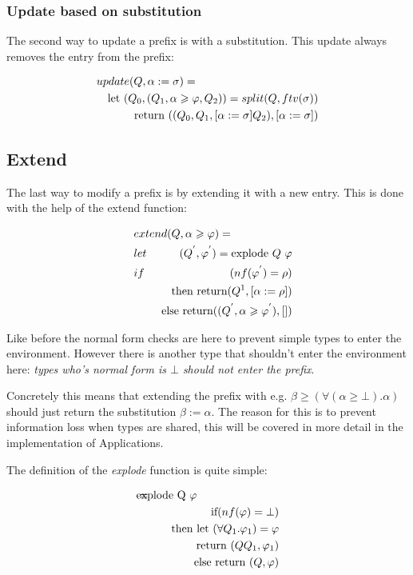 \documentclass[twoside, titlepage, openright, a4paper]{book}
\renewcommand{\geq}{\geqslant}
\begin{document}
\subsubsection{Update based on substitution}
The second way to update a prefix is with a substitution. This update always removes the entry from the prefix:

\begin{eqnarray*}
\lefteqn{update(Q, \alpha := \sigma) =} \\
 & & \textrm{let } (Q_0, (Q_1, \alpha \geq \varphi, Q_2)) = split(Q, ftv(\sigma)) \\
 & & \textrm{return } ((Q_0, Q_1, \lbrack \alpha := \sigma \rbrack Q_2), \lbrack \alpha := \sigma \rbrack)
\end{eqnarray*}
\subsection{Extend}
The last way to modify a prefix is by extending it with a new entry. This is done with the help of the extend function:

\begin{eqnarray*}
\lefteqn{extend(Q,\alpha \geq \varphi) = } \\
\hspace{10pt} &let& (Q^{'}, \varphi^{'}) = \textrm{explode } Q \textrm{ } \varphi \\
              &if&  (nf(\varphi^{'}) = \rho) \\
              & & \textrm{     then return} (Q^{1}, \lbrack \alpha := \rho \rbrack) \\
              & & \textrm{     else return} ((Q^{'}, \alpha \geq \varphi^{'}),\lbrack \rbrack)
\end{eqnarray*}

Like before the normal form checks are here to prevent simple types to enter the environment. However there is another type that shouldn't enter the environment here: \emph{types who's normal form is $\bot$ should not enter the prefix}. 

Concretely this means that extending the prefix with e.g. $\beta \geq (\forall(\alpha \geq \bot).\alpha)$ should just return the substitution $\beta := \alpha$. The reason for this is to prevent information loss when types are shared, this will be covered in more detail in the implementation of Applications.

The definition of the \emph{explode} function is quite simple:

\begin{eqnarray*}
\lefteqn{\textrm{explode Q $\varphi$}} = \\
& & \textrm{if} (nf(\varphi) = \bot) \\
& & \quad \textrm{then let } (\forall Q_1 . \varphi_1) = \varphi \\
& & \quad \quad \quad \textrm{     return } (Q Q_1, \varphi_1) \\
& & \quad \textrm{else return } (Q, \varphi)
\end{eqnarray*}
\end{document}
